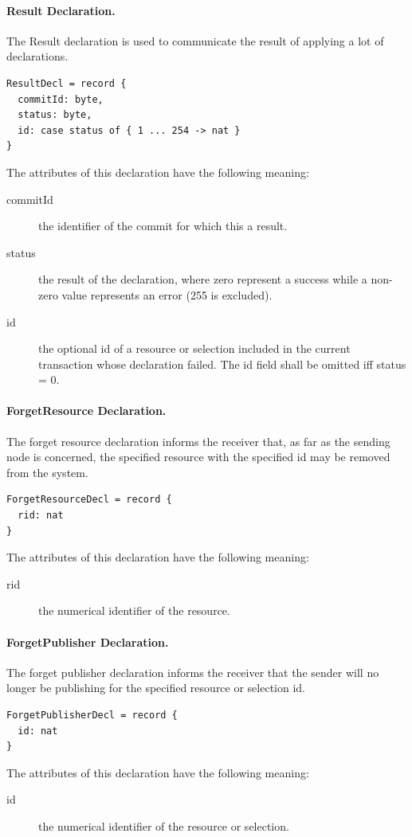\documentclass[a4paper,oneside,article]{memoir}
\begin{document}
\paragraph{Result Declaration.} The Result declaration is used to communicate the result of
applying a lot of declarations.
\begin{verbatim}
ResultDecl = record {
  commitId: byte,
  status: byte,
  id: case status of { 1 ... 254 -> nat }
}
\end{verbatim}
The attributes of this declaration have the following meaning:
\begin{description}
\item[commitId] the identifier of the commit for which this a result.
\item[status] the result of the declaration, where zero represent a success while a non-zero value
  represents an error (255 is excluded).
\item[id] the optional id of a resource or selection included in the current transaction whose
  declaration failed.  The id field shall be omitted iff status = 0.
\end{description}

\paragraph{ForgetResource Declaration.} The forget resource declaration informs the receiver that,
as far as the sending node is concerned, the specified resource with the specified id may be removed
from the system.
\begin{verbatim}
ForgetResourceDecl = record {
  rid: nat
}
\end{verbatim}
The attributes of this declaration have the following meaning:
\begin{description}
\item[rid] the numerical identifier of the resource.
\end{description}

\paragraph{ForgetPublisher Declaration.} The forget publisher declaration informs the receiver that
the sender will no longer be publishing for the specified resource or selection id.
\begin{verbatim}
ForgetPublisherDecl = record {
  id: nat
}
\end{verbatim}
The attributes of this declaration have the following meaning:
\begin{description}
\item[id] the numerical identifier of the resource or selection.
\end{description}
\end{document}
